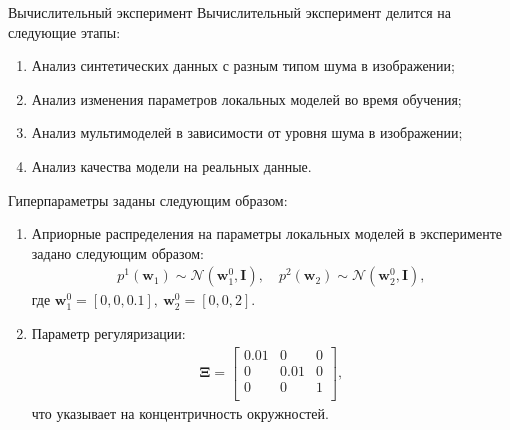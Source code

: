 \documentclass[9pt,pdf,hyperref={unicode}]{beamer}
\begin{document}
\begin{frame}{Вычислительный эксперимент}
\justifying
Вычислительный эксперимент делится на следующие этапы:
\begin{enumerate}
	\item Анализ синтетических данных с разным типом шума в изображении;
	\item Анализ изменения параметров локальных моделей во время обучения;
	\item Анализ мультимоделей в зависимости от уровня шума в изображении;
	\item Анализ качества модели на реальных данные.
\end{enumerate}

Гиперпараметры заданы следующим образом:
\begin{enumerate}
	\item Априорные распределения на параметры локальных моделей в эксперименте задано следующим образом:
\begin{equation*}
\begin{aligned}
p^{1}\left(\textbf{w}_1\right)\sim\mathcal{N}\left(\textbf{w}^{0}_{1}, \textbf{I}\right), \quad p^{2}\left(\textbf{w}_2\right)\sim\mathcal{N}\left(\textbf{w}^{0}_{2}, \textbf{I}\right),
\end{aligned}
\end{equation*}
где $\textbf{w}^{0}_1 = [0, 0, 0.1],\ \textbf{w}^{0}_2 = [0, 0, 2]$.

	\item Параметр регуляризации:
\begin{equation*}
\begin{aligned}
\bm{\Xi} = \begin{bmatrix}
0.01& 0 & 0\\
0& 0.01 & 0\\
0& 0 & 1\\
\end{bmatrix},
\end{aligned}
\end{equation*}
что указывает на концентричность окружностей.
\end{enumerate}

\end{frame}
\end{document}
